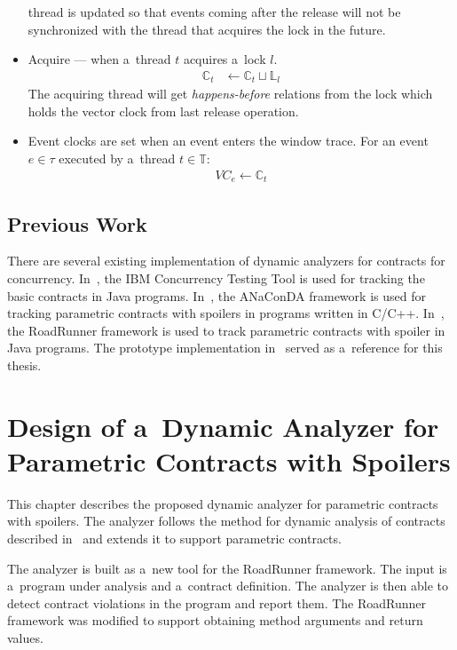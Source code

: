 \begin{itemize}
        thread is updated so that events coming after the release will not be
        synchronized with the thread that acquires the lock in the future.
    \item Acquire --- when a~thread $t$ acquires a~lock $l$.
        \begin{align*}
            \mathbb{C}_t &\leftarrow \mathbb{C}_t \sqcup \mathbb{L}_l
        \end{align*}
        The acquiring thread will get \emph{happens-before} relations from the
        lock which holds the vector clock from last release operation.
    \item Event clocks are set when an event enters the window trace. For an
        event $e \in \tau$ executed by a~thread $t \in \mathbb{T}$:
        \begin{align*}
            VC_e \leftarrow \mathbb{C}_t
        \end{align*}
\end{itemize}


\section{Previous Work}

There are several existing implementation of dynamic analyzers for contracts for
concurrency. In~\cite{FITPUB10817}, the IBM Concurrency Testing Tool is used for
tracking the basic contracts in Java programs. In~\cite{contracts}, the ANaConDA
framework is used for tracking parametric contracts with spoilers in programs
written in C/C++. In~\cite{janousek}, the RoadRunner framework is used to track
parametric contracts with spoiler in Java programs. The prototype implementation
in~\cite{janousek} served as a~reference for this thesis.



\chapter{Design of a~Dynamic Analyzer for Parametric Contracts with Spoilers}
\label{chFour}

This chapter describes the proposed dynamic analyzer for parametric contracts
with spoilers. The analyzer follows the method for dynamic analysis of contracts
described in~\cite{contracts} and extends it to support parametric contracts.

The analyzer is built as a~new tool for the RoadRunner framework. The input is
a~program under analysis and a~contract definition. The analyzer is then able to
detect contract violations in the program and report them. The RoadRunner
framework was modified to support obtaining method arguments and return values.

